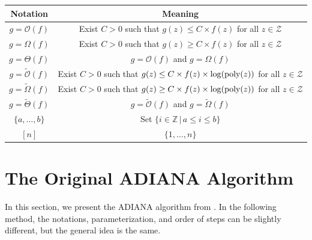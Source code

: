 \documentclass{article} %
\newcommand{\cO}{\mathcal{O}}
\theoremstyle{plain}
\theoremstyle{definition}
\theoremstyle{remark}
\newcommand{\green}{\color{mydarkgreen}}
\newcommand{\algname}[1]{{\small\green\sf #1}}
\begin{document}
\newcommand{\ditto}[1][.4pt]{\xrfill{#1}~''~\xrfill{#1}}
\begin{table}[h]
\centering
\begin{tabular}{cc}
\hline
Notation & Meaning\\
\hline
$g = \cO(f)$ & Exist $C > 0$ such that $g(z) \leq C \times f(z)$ for all $z \in \mathcal{Z}$\\
$g = \Omega(f)$ & Exist $C > 0$ such that $g(z) \geq C \times f(z)$ for all $z \in \mathcal{Z}$\\
$g = \Theta(f)$ & $g = \cO(f)$ and $g = \Omega(f)$ \\
$g = \widetilde{\cO}(f)$ & Exist $C > 0$ such that $g(z) \leq C \times f(z) \times \log (\textnormal{poly}(z))$ for all $z \in \mathcal{Z}$ \\
$g = \widetilde{\Omega}(f)$ & Exist $C > 0$ such that $g(z) \geq C \times f(z) \times \log (\textnormal{poly}(z))$ for all $z \in \mathcal{Z}$ \\
$g = \widetilde{\Theta}(f)$ & $g = \widetilde{\cO}(f)$ and $g = \widetilde{\Omega}(f)$ \\
$\{a, \dots, b\}$ & Set $\{i \in \mathbb{Z}\,|\, a \leq i \leq b\}$ \\
$[n]$ & $\{1, \dots, n\}$ \\
\hline
\end{tabular}
\end{table}

\section{The Original \algname{ADIANA} Algorithm}

\label{sec:original_adiana}

In this section, we present the \algname{ADIANA} algorithm from \citep{ADIANA}. In the following method, the notations, parameterization, and order of steps can be slightly different, but the general idea is the same.
\end{document}
